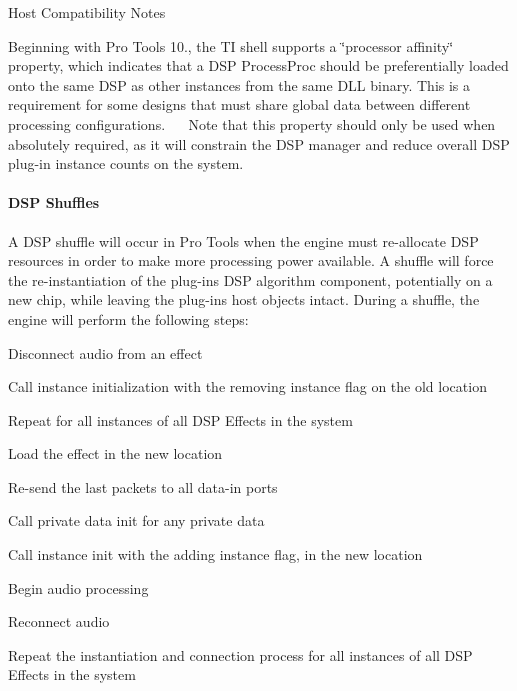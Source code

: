  \begin{DoxyRefDesc}{Host Compatibility Notes}
\item[\mbox{\hyperlink{a00786__compatibility_notes000024}{Host Compatibility Notes}}]Beginning with Pro Tools 10., the TI shell supports a \char`\"{}processor affinity\char`\"{} property, which indicates that a D\+SP Process\+Proc should be preferentially loaded onto the same D\+SP as other instances from the same D\+LL binary. This is a requirement for some designs that must share global data between different processing configurations.~\newline
 ~\newline
 Note that this property should only be used when absolutely required, as it will constrain the D\+SP manager and reduce overall D\+SP plug-\/in instance counts on the system.\end{DoxyRefDesc}


\hypertarget{a00832_subsubsection__dsp_shuffles_}{}\paragraph{D\+S\+P Shuffles}\label{a00832_subsubsection__dsp_shuffles_}
 A D\+SP shuffle will occur in Pro Tools when the engine must re-\/allocate D\+SP resources in order to make more processing power available. A shuffle will force the re-\/instantiation of the plug-\/in\textquotesingle{}s D\+SP algorithm component, potentially on a new chip, while leaving the plug-\/in\textquotesingle{}s host objects intact. During a shuffle, the engine will perform the following steps\+: 
\begin{DoxyEnumerate}
\item Disconnect audio from an effect  
\item Call instance initialization with the removing instance flag on the old location  
\item Repeat for all instances of all D\+SP Effects in the system  
\item Load the effect in the new location  
\item Re-\/send the last packets to all data-\/in ports  
\item Call private data init for any private data  
\item Call instance init with the \textquotesingle{}adding instance\textquotesingle{} flag, in the new location  
\item Begin audio processing  
\item Reconnect audio  
\item Repeat the instantiation and connection process for all instances of all D\+SP Effects in the system  
\end{DoxyEnumerate}

